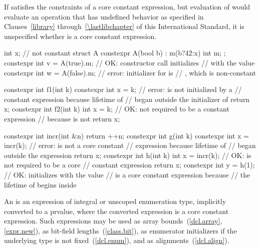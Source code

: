 If  satisfies the constraints of a core constant expression, but
evaluation of  would evaluate an operation that has undefined behavior
as specified in Clauses~\ref{library} through~\ref{\lastlibchapter} of this
International Standard, it is unspecified whether  is a core constant
expression.

\enterexample
\begin{codeblock}
int x;                              // not constant
struct A {
  constexpr A(bool b) : m(b?42:x) { }
  int m;
};
constexpr int v = A(true).m;        // OK: constructor call initializes
                                    //  with the value 
constexpr int w = A(false).m;       // error: initializer for  is
                                    // , which is non-constant

constexpr int f1(int k) {
  constexpr int x = k;              // error:  is not initialized by a
                                    // constant expression because lifetime of 
                                    // began outside the initializer of 
  return x;
}
constexpr int f2(int k) {
  int x = k;                        // OK: not required to be a constant expression
                                    // because  is not 
  return x;
}

constexpr int incr(int &n) {
  return ++n;
}
constexpr int g(int k) {
  constexpr int x = incr(k);        // error:  is not a core constant
                                    // expression because lifetime of 
                                    // began outside the expression 
  return x;
}
constexpr int h(int k) {
  int x = incr(k);                  // OK:  is not required to be a core
                                    // constant expression
  return x;
}
constexpr int y = h(1);             // OK: initializes  with the value 
                                    //  is a core constant expression because
                                    // the lifetime of  begins inside 
\end{codeblock}
\exitexample

\pnum
An  is an expression of integral or
unscoped enumeration type, implicitly converted to a prvalue, where the converted expression is a core constant expression.
\enternote
Such expressions may be
used as array bounds~(\ref{dcl.array}, \ref{expr.new}),
as bit-field lengths~(\ref{class.bit}), as enumerator
initializers if the underlying type is not fixed~(\ref{dcl.enum}),
and as alignments~(\ref{dcl.align}).
\exitnote


